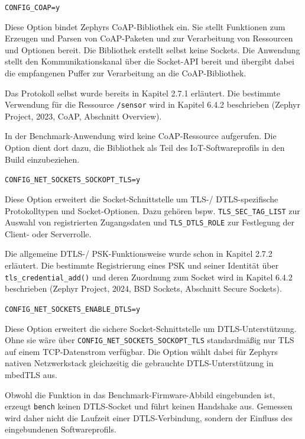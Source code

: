 \lstinline[style=codeinline]|CONFIG_COAP=y|

Diese Option bindet Zephyrs CoAP-Bibliothek ein. Sie stellt Funktionen zum Erzeugen und Parsen von CoAP-Paketen und zur Verarbeitung von Ressourcen und Optionen bereit. Die Bibliothek erstellt selbst keine Sockets. Die Anwendung stellt den Kommunikationskanal {\"u}ber die Socket-API bereit und {\"u}bergibt dabei die empfangenen Puffer zur Verarbeitung an die CoAP-Bibliothek.

Das Protokoll selbst wurde bereits in Kapitel 2.7.1 erl{\"a}utert. Die bestimmte Verwendung f{\"u}r die Ressource \lstinline[style=codeinline]|/sensor| wird in Kapitel 6.4.2 beschrieben (Zephyr Project, 2023, \glqq{}CoAP\grqq{}, Abschnitt \glqq{}Overview\grqq{}).

In der Benchmark-Anwendung wird keine CoAP-Ressource aufgerufen. Die Option dient dort dazu, die Bibliothek als Teil des IoT-Softwareprofils in den Build einzubeziehen.

\lstinline[style=codeinline]|CONFIG_NET_SOCKETS_SOCKOPT_TLS=y|

Diese Option erweitert die Socket-Schnittstelle um TLS-/ DTLS-spezifische Protokolltypen und Socket-Optionen. Dazu geh{\"o}ren bspw. \lstinline[style=codeinline]|TLS_SEC_TAG_LIST| zur Auswahl von registrierten Zugangsdaten und \lstinline[style=codeinline]|TLS_DTLS_ROLE| zur Festlegung der Client- oder Serverrolle.

Die allgemeine DTLS-/ PSK-Funktionsweise wurde schon in Kapitel 2.7.2 erl{\"a}utert. Die bestimmte Registrierung eines PSK und seiner Identit{\"a}t {\"u}ber \lstinline[style=codeinline]|tls_credential_add()| und deren Zuordnung zum Socket wird in Kapitel 6.4.2 beschrieben (Zephyr Project, 2024, \glqq{}BSD Sockets\grqq{}, Abschnitt \glqq{}Secure Sockets\grqq{}).

\lstinline[style=codeinline]|CONFIG_NET_SOCKETS_ENABLE_DTLS=y|

Diese Option erweitert die sichere Socket-Schnittstelle um DTLS-Unterst{\"u}tzung. Ohne sie w{\"a}re {\"u}ber \lstinline[style=codeinline]|CONFIG_NET_SOCKETS_SOCKOPT_TLS| standardm{\"a}{\ss}ig nur TLS auf einem TCP-Datenstrom verf{\"u}gbar. Die Option w{\"a}hlt dabei f{\"u}r Zephyrs nativen Netzwerkstack gleichzeitig die gebrauchte DTLS-Unterst{\"u}tzung in mbedTLS aus.

Obwohl die Funktion in das Benchmark-Firmware-Abbild eingebunden ist, erzeugt \lstinline[style=codeinline]|bench| keinen DTLS-Socket und f{\"u}hrt keinen Handshake aus. Gemessen wird daher nicht die Laufzeit einer DTLS-Verbindung, sondern der Einfluss des eingebundenen Softwareprofils.

